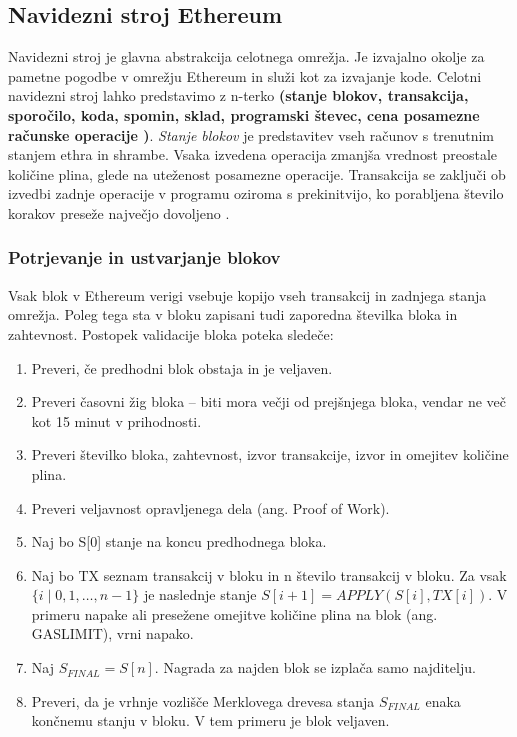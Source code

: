 \documentclass[a4paper, 12pt]{book}
\begin{document}
\subsection{Navidezni stroj Ethereum}

Navidezni stroj je glavna abstrakcija celotnega omrežja.
Je izvajalno okolje za pametne pogodbe v omrežju Ethereum in služi kot  za izvajanje kode.
Celotni navidezni stroj lahko predstavimo z n-terko \textbf{(stanje blokov, transakcija, sporočilo, koda, spomin, sklad, programski števec, cena posamezne računske operacije )}.
\textit{Stanje blokov} je predstavitev vseh računov s trenutnim stanjem ethra in shrambe.
Vsaka izvedena operacija zmanjša vrednost preostale količine plina, glede na uteženost posamezne operacije.
Transakcija se zaključi ob izvedbi zadnje operacije v programu oziroma s prekinitvijo, ko porabljena število korakov preseže največjo dovoljeno \cite{ethereumWhitepaper}.


\subsubsection{Potrjevanje in ustvarjanje blokov}
\label{confirmTxSub}
Vsak blok v Ethereum verigi vsebuje kopijo vseh transakcij in zadnjega stanja omrežja.
Poleg tega sta v bloku zapisani tudi zaporedna številka bloka in zahtevnost.
Postopek validacije bloka poteka sledeče:
\begin{enumerate}
\item Preveri, če predhodni blok obstaja in je veljaven.
\item Preveri časovni žig bloka -- biti mora večji od prejšnjega bloka, vendar ne več kot 15 minut v prihodnosti.
\item Preveri številko bloka, zahtevnost, izvor transakcije, izvor  in omejitev količine plina.
\item Preveri veljavnost opravljenega dela (ang. Proof of Work).
\item Naj bo S[0] stanje na koncu predhodnega bloka.
\item Naj bo TX seznam transakcij v bloku in n število transakcij v bloku. Za vsak 
$\{i \mid 0,1,\dots, n-1\}$
je naslednje stanje
 $S[i+1] = APPLY(S[i], TX[i])$.
V primeru napake ali presežene omejitve količine plina na blok (ang. GASLIMIT), vrni napako.
\item Naj $S_{FINAL} = S[n]$. Nagrada za najden blok se izplača samo najditelju.
\item Preveri, da je vrhnje vozlišče Merklovega drevesa stanja $S_{FINAL}$ enaka končnemu stanju v bloku. V tem primeru je blok veljaven.
\end{enumerate}
\end{document}
